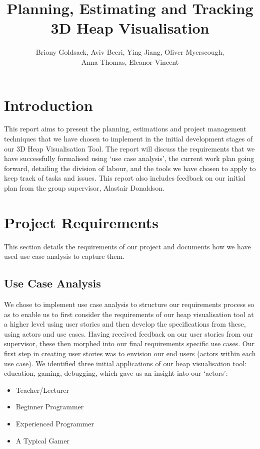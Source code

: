 \documentclass[10pt, a4paper]{article}
\begin{document}
\title{Planning, Estimating and Tracking
\\ 3D Heap Visualisation}
\author{Briony Goldsack, Aviv Beeri, Ying Jiang, Oliver Myerscough, 
\\ Anna Thomas, Eleanor Vincent}
\maketitle

\section{Introduction} 
This report aims to present the planning, estimations and project management techniques that we have chosen to implement in the initial development stages of our 3D Heap Visualisation Tool. The report will discuss the requirements that we have successfully formalised using ‘use case analysis’, the current work plan going forward, detailing the division of labour, and the tools we have chosen to apply to keep track of tasks and issues. This report also includes feedback on our initial plan from the group supervisor, Alastair Donaldson. 

\section{Project Requirements}
This section details the requirements of our project and documents how we have used use case analysis to capture them.

\subsection{Use Case Analysis}

We chose to implement use case analysis to structure our requirements process so as to enable us to first consider the requirements of our heap visualisation tool at a higher level using user stories and then develop the specifications from these, using actors and use cases. Having received feedback on our user stories from our supervisor, these then morphed into our final requirements specific use cases. Our first step in creating user stories was to envision our end users (actors within each use case). We identified three initial applications of our heap visualisation tool: education, gaming, debugging, which gave us an insight into our ‘actors’:

\begin{itemize}

  \item Teacher/Lecturer
  \item Beginner Programmer
  \item Experienced Programmer 
  \item A Typical Gamer 

\end{itemize}
\end{document}
